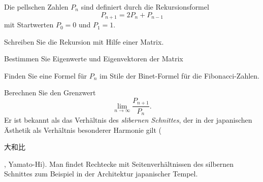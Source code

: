Die pellschen Zahlen $P_n$ sind definiert durch die Rekursionsformel
\begin{equation}
P_{n+1} = 2P_n + P_{n-1}
\label{80000046:rekursion}
\end{equation}
mit Startwerten $P_0=0$ und $P_1=1$.
\begin{teilaufgaben}
\item
Schreiben Sie die Rekursion mit Hilfe einer Matrix.
\item
Bestimmen Sie Eigenwerte und Eigenvektoren der Matrix
\item
Finden Sie eine Formel für $P_n$ im Stile der Binet-Formel für die
Fibonacci-Zahlen.
\item
Berechnen Sie den Grenzwert
\[
\lim_{n\to \infty} \frac{P_{n+1}}{P_n}.
\]
Er ist bekannt als das Verhältnis des {\em slibernen Schnittes}, der
in der japanischen Ästhetik als Verhältnis besonderer Harmonie gilt
(\begin{CJK}{UTF8}{min}大和比\end{CJK}, Yamato-Hi).
Man findet Rechtecke mit Seitenverhältnissen des silbernen Schnittes
zum Beispiel in der Architektur japanischer Tempel.
\end{teilaufgaben}

